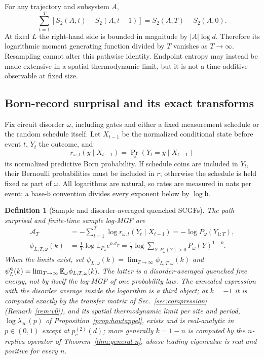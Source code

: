 \documentclass[aps,prx,reprint,superscriptaddress,nobibnotes,longbibliography]{revtex4-2}
\newtheorem{definition}{Definition}
\theoremstyle{remark}
\newcommand{\E}{\mathbb E}
\begin{document}
For any trajectory and subsystem $A$,
\begin{equation}
 \sum_{t=1}^T[S_2(A,t)-S_2(A,t-1)]=S_2(A,T)-S_2(A,0).
 \label{eq:telescoping}
\end{equation}
At fixed $L$ the right-hand side is bounded in magnitude by $|A|\log d$.  Therefore its logarithmic moment generating function divided by $T$ vanishes as $T\to\infty$.  Resampling cannot alter this pathwise identity.  Endpoint entropy may instead be made extensive in a spatial thermodynamic limit, but it is not a time-additive observable at fixed size.

\subsection{Born-record surprisal and its exact transforms}

Fix circuit disorder $\omega$, including gates and either a fixed measurement schedule or the random schedule itself.  Let $X_{t-1}$ be the normalized conditional state before event $t$, $Y_t$ the outcome, and
\begin{equation}
 r_{\omega,t}(y\mid X_{t-1})=\Pr_\omega(Y_t=y\mid X_{t-1})
\end{equation}
its normalized predictive Born probability.  If schedule coins are included in $Y_t$, their Bernoulli probabilities must be included in $r$; otherwise the schedule is held fixed as part of $\omega$.  All logarithms are natural, so rates are measured in nats per event; a base-$\mathsf b$ convention divides every exponent below by $\log\mathsf b$.

\begin{definition}[Sample and disorder-averaged quenched SCGFs]
\label{def:records}
The path surprisal and finite-time sample log-MGF are
\begin{align}
 \mathcal A_T&=-\sum_{t=1}^T\log r_{\omega,t}(Y_t\mid X_{t-1})
     =-\log P_\omega(Y_{1:T}),\\
 \phi_{L,T,\omega}(k)&=\frac1T\log\E_{P_\omega}e^{k\mathcal A_T}
 =\frac1T\log\!\!\sum_{Y:P_\omega(Y)>0}\!\!P_\omega(Y)^{1-k}.
 \label{eq:recordscgf}
\end{align}
When the limits exist, set
$\psi_{L,\omega}(k)=\lim_{T\to\infty}\phi_{L,T,\omega}(k)$ and
$\psi_L^{\rm q}(k)=\lim_{T\to\infty}\E_\omega\phi_{L,T,\omega}(k)$.
The latter is a disorder-averaged quenched free energy, not by itself the log-MGF of one probability law.  The annealed expression with the disorder average inside the logarithm is a third object; at $k=-1$ it is computed exactly by the transfer matrix of Sec.~\ref{sec:compression} (Remark~\ref{rem:v0}), and its spatial thermodynamic limit per site and period, $\log\lambda_\infty(p)$ of Proposition~\ref{prop:houtappel}, exists and is real-analytic in $p\in(0,1)$ except at $p_c^{(2)}(d)$; more generally $k=1-n$ is computed by the $n$-replica operator of Theorem~\ref{thm:general-n}, whose leading eigenvalue is real and positive for every $n$.
\end{definition}
\end{document}
